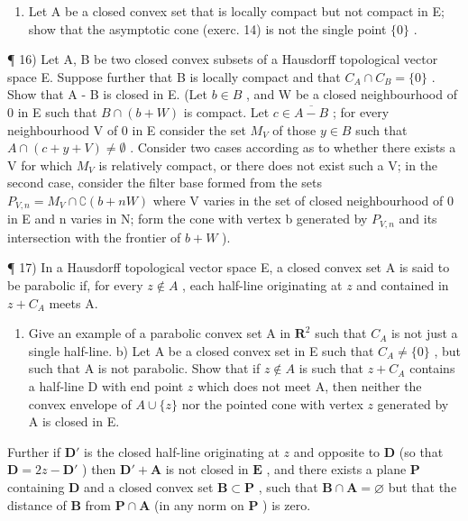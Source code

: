 \begin{enumerate}
\def\labelenumi{\alph{enumi})}
\setcounter{enumi}{1}
\tightlist
\item
  Let A be a closed convex set that is locally compact but not compact in E; show that the asymptotic cone (exerc. 14) is not the single point \(\{0\}\) .
\end{enumerate}

¶ 16) Let A, B be two closed convex subsets of a Hausdorff topological vector space E. Suppose further that B is locally compact and that \(C_A \cap C_B = \{0\}\) . Show that A - B is closed in E. (Let \(b \in B\) , and W be a closed neighbourhood of 0 in E such that \(B \cap (b + W)\) is compact. Let \(c \in \overline{A - B}\) ; for every neighbourhood V of 0 in E consider the set \(M_V\) of those \(y \in B\) such that \(A \cap (c + y + V) \neq \emptyset\) . Consider two cases according as to whether there exists a V for which \(M_V\) is relatively compact, or there does not exist such a V; in the second case, consider the filter base formed from the sets \(P_{V,n} = M_V \cap \complement (b + nW)\) where V varies in the set of closed neighbourhood of 0 in E and n varies in N; form the cone with vertex b generated by \(P_{V,n}\) and its intersection with the frontier of \(b + W\) ).

¶ 17) In a Hausdorff topological vector space E, a closed convex set A is said to be parabolic if, for every \(z \notin A\) , each half-line originating at \(z\) and contained in \(z + C_A\) meets A.

\begin{enumerate}
\def\labelenumi{\alph{enumi})}
\tightlist
\item
  Give an example of a parabolic convex set A in \(\mathbf{R}^2\) such that \(C_A\) is not just a single half-line. b) Let A be a closed convex set in E such that \(C_A \neq \{0\}\) , but such that A is not parabolic. Show that if \(z \notin A\) is such that \(z + C_A\) contains a half-line D with end point \(z\) which does not meet A, then neither the convex envelope of \(A \cup \{z\}\) nor the pointed cone with vertex \(z\) generated by A is closed in E.
\end{enumerate}

Further if \(\mathbf{D}'\) is the closed half-line originating at \(z\) and opposite to \(\mathbf{D}\) (so that \(\mathbf{D} = 2z - \mathbf{D}'\) ) then \(\mathbf{D}' + \mathbf{A}\) is not closed in \(\mathbf{E}\) , and there exists a plane \(\mathbf{P}\) containing \(\mathbf{D}\) and a closed convex set \(\mathbf{B} \subset \mathbf{P}\) , such that \(\mathbf{B} \cap \mathbf{A} = \varnothing\) but that the distance of \(\mathbf{B}\) from \(\mathbf{P} \cap \mathbf{A}\) (in any norm on \(\mathbf{P}\) ) is zero.

